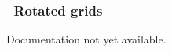 \vssub
\subsubsection{~Rotated grids} \label{sub:num_space_rotagrid}

\noindent
Documentation not yet available.
